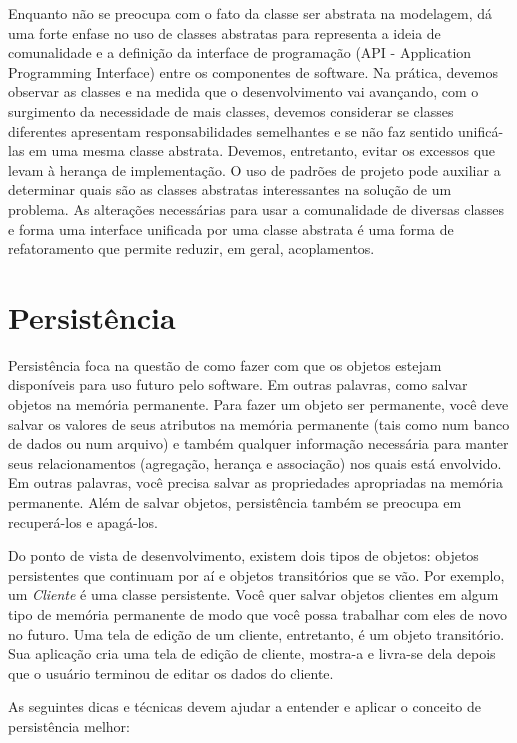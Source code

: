 \documentclass[
	11pt,				%
	openright,
	twoside,			%
	a4paper,			%
	english,			%
	french,
	brazil,				%
	sumario=tradicional
	]{abntex2}
\begin{document}
Enquanto  não se preocupa com o fato da classe ser abstrata na modelagem,  dá uma forte enfase no uso de classes abstratas para representa a ideia de comunalidade e a definição da interface de programação (API - Application Programming Interface) entre os componentes de software. Na prática, devemos observar as classes e na medida que o desenvolvimento vai avançando, com o surgimento da necessidade de mais classes, devemos considerar se classes diferentes apresentam responsabilidades semelhantes e se não faz sentido unificá-las em uma mesma classe abstrata. Devemos, entretanto, evitar os excessos que levam à herança de implementação. O uso de padrões de projeto pode auxiliar a determinar quais são as classes abstratas interessantes na solução de um problema. As alterações necessárias para usar a comunalidade de diversas classes e forma uma interface unificada por uma classe abstrata é uma forma de refatoramento que permite reduzir, em geral, acoplamentos.

\section{Persistência}

Persistência foca na questão de como fazer com que os objetos estejam disponíveis para uso futuro pelo software. Em outras palavras, como salvar objetos na memória permanente. Para fazer um objeto ser permanente, você deve salvar os valores de seus atributos na memória permanente (tais como num banco de dados ou num arquivo) e também qualquer informação necessária para manter seus relacionamentos (agregação, herança e associação) nos quais está envolvido. Em outras palavras, você precisa salvar as propriedades apropriadas na memória permanente. Além de salvar objetos, persistência também se preocupa em recuperá-los e apagá-los.

Do ponto de vista de desenvolvimento, existem dois tipos de objetos: objetos persistentes que continuam por aí e objetos transitórios que se vão. Por exemplo, um \emph{Cliente} é uma classe persistente. Você quer salvar objetos clientes em algum tipo de memória permanente de modo que você possa trabalhar com eles de novo no futuro. Uma tela de edição de um cliente, entretanto, é um objeto transitório. Sua aplicação cria uma tela de edição de cliente, mostra-a e livra-se dela depois que o usuário terminou de editar os dados do cliente.

As seguintes dicas e técnicas devem ajudar a entender e aplicar o conceito de persistência melhor:
\end{document}
